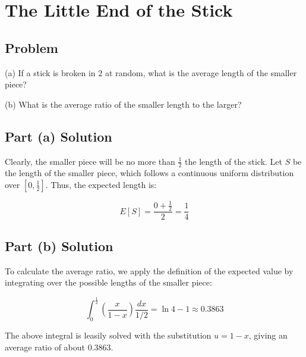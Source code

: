 \documentclass{article}
\date{}
\author{Kaan Aksoy | March 10, 2020}
\begin{document}
\maketitle
\section{The Little End of the Stick}
\subsection{Problem}

(a) If a stick is broken in $2$ at random, what is the average 
length of the smaller piece?

(b) What is the average ratio of the smaller length to the 
larger?

\subsection{Part (a) Solution}

Clearly, the smaller piece will be no more than $\frac{1}{2}$ the 
length of the stick. Let $S$ be the length of the smaller piece, 
which follows a continuous uniform distribution over $[0, \frac{1}{2}]$.
Thus, the expected length is:

$$E[S] = \frac{0 + \frac{1}{2}}{2} = \frac{1}{4}$$

\subsection{Part (b) Solution}

To calculate the average ratio, we apply the 
definition of the expected value by integrating 
over the possible lengths of the smaller piece: 

$$\int_0^{\frac{1}{2}} \left(\frac{x}{1-x}\right) \frac{dx}{1/2}
= \ln{4} - 1 \approx 0.3863$$

The above integral is leasily solved with the 
substitution $u=1-x$, giving an average ratio 
of about $0.3863$.
\end{document}
